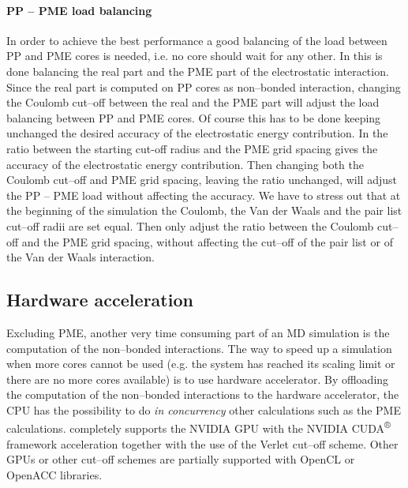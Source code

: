 \paragraph{\textbf{PP -- PME load balancing}} In order to achieve the best performance a good balancing of the 
load between \ac{PP} and \ac{PME} cores is needed, i.e. no core should wait for any other. In \gromacs{} this is 
done balancing the real part and the \ac{PME} part of the electrostatic interaction. Since the real part is 
computed on \ac{PP} cores as non--bonded interaction, changing the Coulomb cut--off between the real and the 
\ac{PME} part will adjust the load balancing between \ac{PP} and \ac{PME} cores. Of course this has to be done 
keeping unchanged the desired accuracy of the electrostatic energy contribution. In \gromacs{} the ratio between 
the starting cut-off radius and the \ac{PME} grid spacing gives the accuracy of the electrostatic energy 
contribution. Then changing both the Coulomb cut--off and \ac{PME} grid spacing, leaving the ratio unchanged, 
will adjust the \ac{PP} -- \ac{PME} load without affecting the accuracy. We have to stress out that at the 
beginning of the simulation the Coulomb, the Van der Waals and the pair list cut--off radii are set equal. Then 
\gromacs{} only adjust the ratio between the Coulomb cut--off and the \ac{PME} grid spacing, without affecting the 
cut--off of the pair list or of the Van der Waals interaction.

\subsection{Hardware acceleration}
Excluding \ac{PME}, another very time consuming part of an \ac{MD} simulation is the computation of the 
non--bonded interactions. The way to speed up a simulation when more cores cannot be used (e.g. the system has 
reached its scaling limit or there are no more cores available) is to use hardware accelerator. 
By offloading the computation of the non--bonded interactions to the hardware accelerator, the CPU has the 
possibility to do \textit{in concurrency} other calculations such as the \ac{PME} calculations. \gromacs{} 
completely supports the NVIDIA GPU with the NVIDIA CUDA\textsuperscript{®} framework acceleration together with 
the use of the Verlet cut--off scheme. Other GPUs or other cut--off schemes are partially supported with OpenCL or 
OpenACC libraries. 

